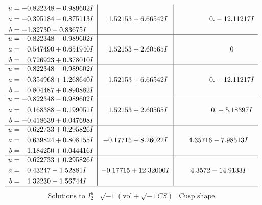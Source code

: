 \documentclass[1p]{elsarticle_modified}
\theoremstyle{definition}
\newcommand{\I}{\sqrt{-1}}
\begin{document}
$$\begin{array}{c|c|c}
\begin{aligned}
u &= -0.822348 - 0.989602 I \\
a &= -0.395184 - 0.875113 I \\
b &= -1.32730 - 0.83675 I\end{aligned}
 & \phantom{-}1.52153 + 6.66542 I & \phantom{-0.000000 } 0. - 12.11217 I \\ \hline\begin{aligned}
u &= -0.822348 - 0.989602 I \\
a &= \phantom{-}0.547490 + 0.651940 I \\
b &= \phantom{-}0.726923 + 0.378010 I\end{aligned}
 & \phantom{-}1.52153 + 2.60565 I & \phantom{-0.000000 } 0 \\ \hline\begin{aligned}
u &= -0.822348 - 0.989602 I \\
a &= -0.354968 + 1.268640 I \\
b &= \phantom{-}0.804487 + 0.890882 I\end{aligned}
 & \phantom{-}1.52153 + 6.66542 I & \phantom{-0.000000 } 0. - 12.11217 I \\ \hline\begin{aligned}
u &= -0.822348 - 0.989602 I \\
a &= \phantom{-}0.168388 - 0.199051 I \\
b &= -0.418639 + 0.047698 I\end{aligned}
 & \phantom{-}1.52153 + 2.60565 I & \phantom{-0.000000 } 0. - 5.18397 I \\ \hline\begin{aligned}
u &= \phantom{-}0.622733 + 0.295826 I \\
a &= \phantom{-}0.639824 + 0.808155 I \\
b &= -1.184250 + 0.044416 I\end{aligned}
 & -0.17715 + 8.26022 I & \phantom{-}4.35716 - 7.98513 I \\ \hline\begin{aligned}
u &= \phantom{-}0.622733 + 0.295826 I \\
a &= \phantom{-}0.43247 - 1.52881 I \\
b &= \phantom{-}1.32230 - 1.56744 I\end{aligned}
 & -0.17715 + 12.32000 I & \phantom{-}4.3572 - 14.9133 I\\
 \hline 
 \end{array}$$\newpage$$\begin{array}{c|c|c}  
\text{Solutions to }I^u_{2}& \I (\text{vol} + \sqrt{-1}CS) & \text{Cusp shape}\\

\end{array}$$
\end{document}
